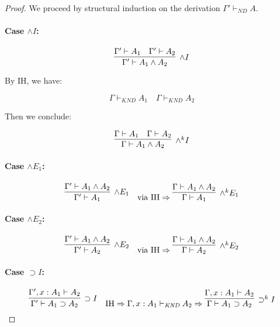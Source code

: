 \documentclass{article}
\begin{document}
    \begin{proof}
    We proceed by structural induction on the derivation \( \Gamma' \vdash_{\textit{ND}} A \).
    
    \paragraph{Case \(\land I\):}
    
    \[
    \infer[\land I]{\Gamma' \vdash A_1 \land A_2}{
      \Gamma' \vdash A_1 \quad \Gamma' \vdash A_2
    }
    \]
    
    By IH, we have:
    
    \[
    \Gamma \vdash_{\textit{KND}} A_1 \quad \Gamma \vdash_{\textit{KND}} A_2
    \]
    
    Then we conclude:
    
    \[
    \infer[\land^k I]{\Gamma \vdash A_1 \land A_2}{
      \Gamma \vdash A_1 \quad \Gamma \vdash A_2
    }
    \]
    
    \paragraph{Case \(\land E_1\):}
    
    \[
    \infer[\land E_1]{\Gamma' \vdash A_1}{
      \Gamma' \vdash A_1 \land A_2
    }
    \quad \text{via IH} \Rightarrow
    \infer[\land^k E_1]{\Gamma \vdash A_1}{
      \Gamma \vdash A_1 \land A_2
    }
    \]
    
    \paragraph{Case \(\land E_2\):}
    
    \[
    \infer[\land E_2]{\Gamma' \vdash A_2}{
      \Gamma' \vdash A_1 \land A_2
    }
    \quad \text{via IH} \Rightarrow
    \infer[\land^k E_2]{\Gamma \vdash A_2}{
      \Gamma \vdash A_1 \land A_2
    }
    \]
    
    \paragraph{Case \(\supset I\):}
    
    \[
    \infer[\supset I]{\Gamma' \vdash A_1 \supset A_2}{
      \Gamma', x:A_1 \vdash A_2
    }
    \quad \text{IH} \Rightarrow \Gamma, x:A_1 \vdash_{\textit{KND}} A_2
    \Rightarrow
    \infer[\supset^k I]{\Gamma \vdash A_1 \supset A_2}{
      \Gamma, x:A_1 \vdash A_2
    }
    \]
    

\end{proof}
\end{document}
